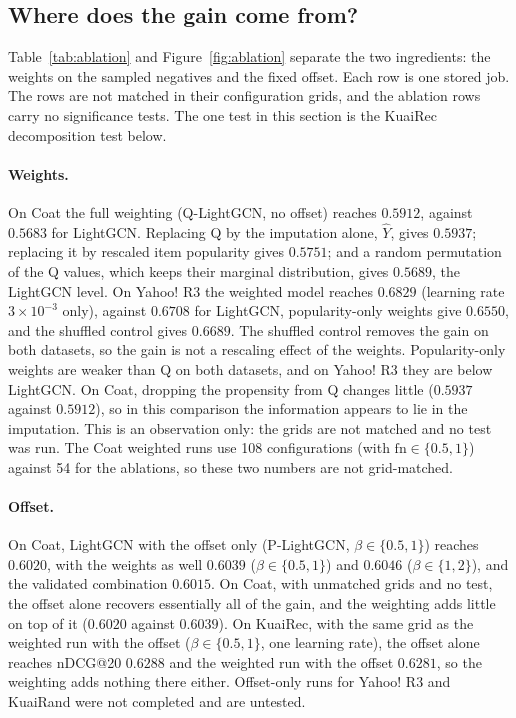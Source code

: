 

\subsection{Where does the gain come from?}\label{sec:ablations}

Table~\ref{tab:ablation} and Figure~\ref{fig:ablation} separate the two ingredients: the weights on the
sampled negatives and the fixed offset. Each row is one stored job. The rows are not matched in their
configuration grids, and the ablation rows carry no significance tests. The one test in this section is the KuaiRec decomposition test below.

\paragraph{Weights.} On Coat the full weighting (Q-LightGCN, no offset) reaches $0.5912$, against $0.5683$
for LightGCN. Replacing Q by the imputation alone, $\hat Y$, gives $0.5937$; replacing it by rescaled item
popularity gives $0.5751$; and a random permutation of the Q values, which keeps their marginal distribution,
gives $0.5689$, the LightGCN level. On Yahoo! R3 the weighted model reaches $0.6829$ (learning rate $3\times10^{-3}$
only), against $0.6708$ for LightGCN, popularity-only weights give $0.6550$, and the shuffled control gives
$0.6689$. The shuffled control removes the gain on both datasets, so the gain is not a rescaling effect of the
weights. Popularity-only weights are weaker than Q on both datasets, and on Yahoo! R3 they are below LightGCN.
On Coat, dropping the propensity from Q changes little ($0.5937$ against $0.5912$), so in this comparison the information appears to lie in the
imputation. This is an observation only: the grids are not matched and no test was run. The Coat weighted runs use 108 configurations (with $\mathrm{fn}\in\{0.5,1\}$) against 54 for the
ablations, so these two numbers are not grid-matched.

\paragraph{Offset.} On Coat, LightGCN with the offset only (P-LightGCN, $\beta\in\{0.5,1\}$)
reaches $0.6020$, with the weights as well $0.6039$ ($\beta\in\{0.5,1\}$) and $0.6046$ ($\beta\in\{1,2\}$), and the
validated combination $0.6015$. On Coat, with unmatched grids and no test, the offset alone recovers essentially all of the gain, and the
weighting adds little on top of it ($0.6020$ against $0.6039$). On KuaiRec, with the same grid as the weighted run with the offset
($\beta\in\{0.5,1\}$, one learning rate), the offset alone reaches nDCG@20 $0.6288$ and the weighted run with the offset
$0.6281$, so the weighting adds nothing there either. Offset-only runs for Yahoo! R3 and KuaiRand were not completed and are untested.

